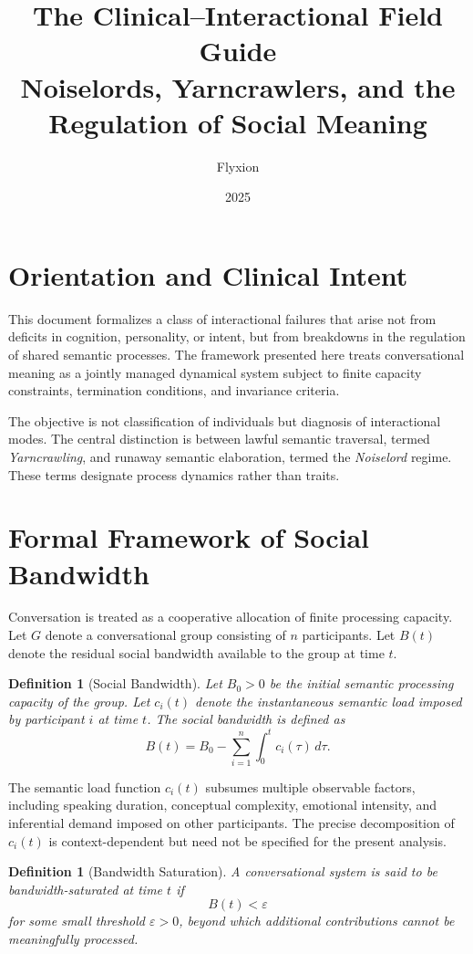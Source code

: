 \documentclass[12pt]{article}
\title{\textbf{The Clinical–Interactional Field Guide}\\
\large Noiselords, Yarncrawlers, and the Regulation of Social Meaning}
\author{Flyxion}
\date{2025}
\newtheorem{definition}[theorem]{Definition}
\theoremstyle{remark}
\begin{document}
\maketitle

\section{Orientation and Clinical Intent}

This document formalizes a class of interactional failures that arise not from deficits in cognition, personality, or intent, but from breakdowns in the regulation of shared semantic processes. The framework presented here treats conversational meaning as a jointly managed dynamical system subject to finite capacity constraints, termination conditions, and invariance criteria.

The objective is not classification of individuals but diagnosis of interactional modes. The central distinction is between lawful semantic traversal, termed \emph{Yarncrawling}, and runaway semantic elaboration, termed the \emph{Noiselord} regime. These terms designate process dynamics rather than traits.

\section{Formal Framework of Social Bandwidth}

Conversation is treated as a cooperative allocation of finite processing capacity. Let $G$ denote a conversational group consisting of $n$ participants. Let $B(t)$ denote the residual social bandwidth available to the group at time $t$.

\begin{definition}[Social Bandwidth]
Let $B_0 > 0$ be the initial semantic processing capacity of the group. Let $c_i(t)$ denote the instantaneous semantic load imposed by participant $i$ at time $t$. The social bandwidth is defined as
\[
B(t) = B_0 - \sum_{i=1}^{n} \int_0^t c_i(\tau)\, d\tau.
\]
\end{definition}

The semantic load function $c_i(t)$ subsumes multiple observable factors, including speaking duration, conceptual complexity, emotional intensity, and inferential demand imposed on other participants. The precise decomposition of $c_i(t)$ is context-dependent but need not be specified for the present analysis.

\begin{definition}[Bandwidth Saturation]
A conversational system is said to be bandwidth-saturated at time $t$ if
\[
B(t) < \varepsilon
\]
for some small threshold $\varepsilon > 0$, beyond which additional contributions cannot be meaningfully processed.
\end{definition}
\end{document}
